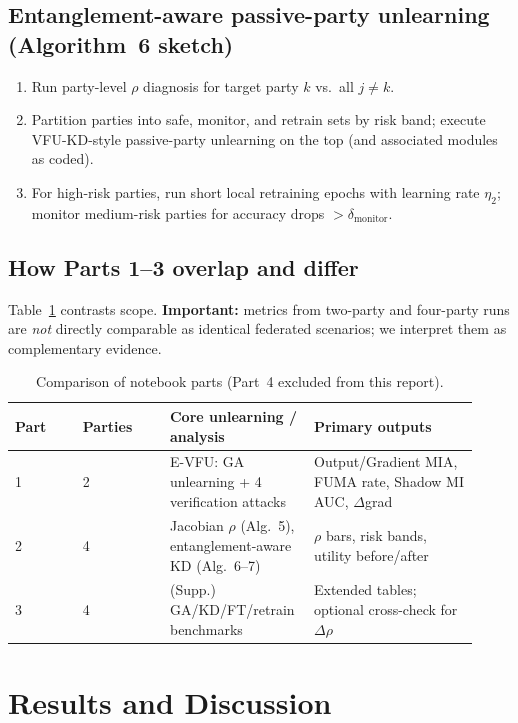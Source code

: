 \documentclass[sigconf,nonacm]{acmart}
\begin{document}
\subsection{Entanglement-aware passive-party unlearning (Algorithm~6 sketch)}
\begin{enumerate}[leftmargin=*]
  \item Run party-level $\rho$ diagnosis for target party $k$ vs.\ all $j\neq k$.
  \item Partition parties into safe, monitor, and retrain sets by risk band; execute VFU-KD-style passive-party unlearning on the top (and associated modules as coded).
  \item For high-risk parties, run short local retraining epochs with learning rate $\eta_2$; monitor medium-risk parties for accuracy drops $>\delta_{\mathrm{monitor}}$.
\end{enumerate}

\subsection{How Parts 1--3 overlap and differ}
Table~\ref{tab:partcompare} contrasts scope. \textbf{Important:} metrics from two-party and four-party runs are \emph{not} directly comparable as identical federated scenarios; we interpret them as complementary evidence.

\begin{table}[t]
  \caption{Comparison of notebook parts (Part~4 excluded from this report).}
  \label{tab:partcompare}
  \centering
  \small
  \begin{tabular}{@{}p{0.14\linewidth}p{0.18\linewidth}p{0.26\linewidth}p{0.34\linewidth}@{}}
    \toprule
    Part & Parties & Core unlearning / analysis & Primary outputs \\
    \midrule
    1 & 2 & E-VFU: GA unlearning + 4 verification attacks & Output/Gradient MIA, FUMA rate, Shadow MI AUC, $\Delta$grad \\
    2 & 4 & Jacobian $\rho$ (Alg.~5), entanglement-aware KD (Alg.~6--7) & $\rho$ bars, risk bands, utility before/after \\
    3 & 4 & (Supp.) GA/KD/FT/retrain benchmarks & Extended tables; optional cross-check for $\Delta\rho$ \\
    \bottomrule
  \end{tabular}
\end{table}

\section{Results and Discussion}
\label{sec:results}
\end{document}
